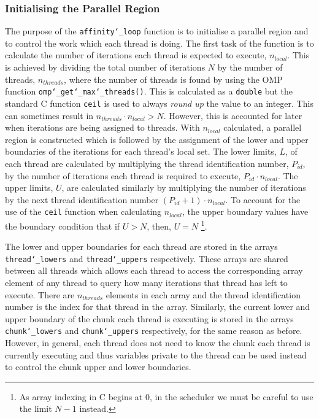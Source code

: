 \documentclass[11pt, a4paper]{article}
\begin{document}
			\subsubsection{Initialising the Parallel Region} \label{sect:parallel_region}
				The purpose of the \texttt{affinity\char`_loop} function is to initialise a parallel region and to control the work which each thread is doing. The first task of the function is to calculate the number of iterations each thread is expected to execute, $n_{local}$. This is achieved by dividing the total number of iterations $N$ by the number of threads, $n_{threads}$, where the number of threads is found by using the OMP function \texttt{omp\char`_get\char`_max\char`_threads()}. This is calculated as a \texttt{double} but the standard C function \texttt{ceil} is used to always \textit{round up} the value to an integer. This can sometimes result in $n_{threads} \cdot n_{local} > N$. However, this is accounted for later when iterations are being assigned to threads. With $n_{local}$ calculated, a parallel region is constructed which is followed by the assignment of the lower and upper boundaries of the iterations for each thread's local set. The lower limits, $L$, of each thread are calculated by multiplying the thread identification number, $P_{id}$, by the number of iterations each thread is required to execute,  $P_{id} \cdot n_{local}$. The upper limits, $U$, are calculated similarly by multiplying the number of iterations  by the next thread identification number $(P_{id} + 1) \cdot n_{local}$. %
				To account for the use of the \texttt{ceil} function when calculating $n_{local}$, the upper boundary values have the boundary condition that if $U > N$, then, $U = N$ \footnote{As array indexing in C begins at 0, in the scheduler we must be careful to use the limit $N-1$ instead.}.
				
				The lower and upper boundaries for each thread are stored in the arrays \texttt{thread\char`_lowers} and \texttt{thread\char`_uppers} respectively. These arrays are shared between all threads which allows each thread to access the corresponding array element of any thread to query how many iterations that thread has left to execute. There are $n_{threads}$ elements in each array and the thread identification number is the index for that thread in the array. Similarly, the current lower and upper boundary of the chunk each thread is executing is stored in the arrays \texttt{chunk\char`_lowers} and \texttt{chunk\char`_uppers} respectively, for the same reason as before. However, in general, each thread does not need to know the chunk each thread is currently executing and thus variables private to the thread can be used instead to control the chunk upper and lower boundaries. 
				
\end{document}
